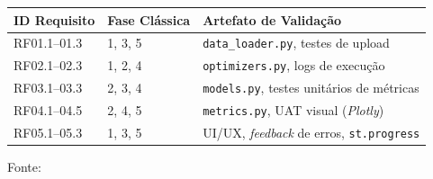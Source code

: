\begin{quadro}[ht]
\begin{center}
\small
\captionsetup{justification=centering, labelsep=endash, width=0.75\linewidth}
\caption{Matriz de rastreabilidade de requisitos (RTM)}
\label{quadro:rtm}
\begin{threeparttable}
\begin{tabularx}{\textwidth}{|l|X|X|} \hline
\textbf{ID Requisito} & \textbf{Fase Clássica} & \textbf{Artefato de Validação} \\ \hline
RF01.1--01.3 & 1, 3, 5 & \texttt{data\_loader.py}, testes de upload \\ \hline
RF02.1--02.3 & 1, 2, 4 & \texttt{optimizers.py}, logs de execução \\ \hline
RF03.1--03.3 & 2, 3, 4 & \texttt{models.py}, testes unitários de métricas \\ \hline
RF04.1--04.5 & 2, 4, 5 & \texttt{metrics.py}, UAT visual (\textit{Plotly}) \\ \hline
RF05.1--05.3 & 1, 3, 5 & UI/UX, \textit{feedback} de erros, \texttt{st.progress} \\ \hline
\end{tabularx}
\begin{tablenotes}[flushleft]
\footnotesize
\item Fonte:~\oautor
\end{tablenotes}
\end{threeparttable}
\end{center}
\end{quadro}